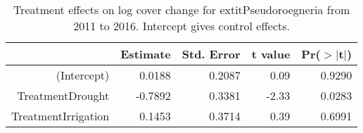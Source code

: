 \begin{table}[ht]
\centering
\caption{Treatment effects on log cover change for 	extit{Pseudoroegneria} from 2011 to 2016. Intercept gives control effects.} 
\label{table:changePSSP}
\begin{tabular}{rrrrr}
  \hline
 & Estimate & Std. Error & t value & Pr($>$$|$t$|$) \\ 
  \hline
(Intercept) & 0.0188 & 0.2087 & 0.09 & 0.9290 \\ 
  TreatmentDrought & -0.7892 & 0.3381 & -2.33 & 0.0283 \\ 
  TreatmentIrrigation & 0.1453 & 0.3714 & 0.39 & 0.6991 \\ 
   \hline
\end{tabular}
\end{table}
